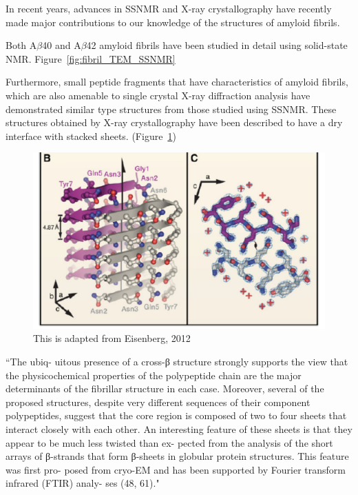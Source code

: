 
In recent years, advances in SSNMR and X-ray crystallography have recently made major contributions to our knowledge of the structures of amyloid fibrils.

Both A$\beta$40 and A$\beta$42 amyloid fibrils have been studied in detail using solid-state NMR. Figure~\ref{fig:fibril_TEM_SSNMR}

Furthermore, small peptide fragments that have characteristics of amyloid fibrils, which are also amenable to single crystal X-ray diffraction analysis have demonstrated similar type structures from those studied using SSNMR.  These structures obtained by X-ray crystallography have been described to have a dry interface with stacked sheets. (Figure~\ref{fig:fibril_xray_model})

\begin{figure}
  \centering
  \includegraphics[width=6in]{figures/introduction/fibril_xray_model.pdf}
  \caption[Characteristic cross-$\beta$ spacings from X-ray fibre diffraction studies of amyloid fibrils]{This is adapted from Eisenberg, 2012}
  \label{fig:fibril_xray_model}
\end{figure}


``The ubiq- uitous presence of a cross-β structure strongly supports the view that the physicochemical properties of the polypeptide chain are the major determinants of the fibrillar structure in each case. Moreover, several of the proposed structures, despite very different sequences of their component polypeptides, suggest that the core region is composed of two to four sheets that interact closely with each other. An interesting feature of these sheets is that they appear to be much less twisted than ex- pected from the analysis of the short arrays of β-strands that form β-sheets in globular protein structures. This feature was first pro- posed from cryo-EM and has been supported by Fourier transform infrared (FTIR) analy- ses (48, 61)."

